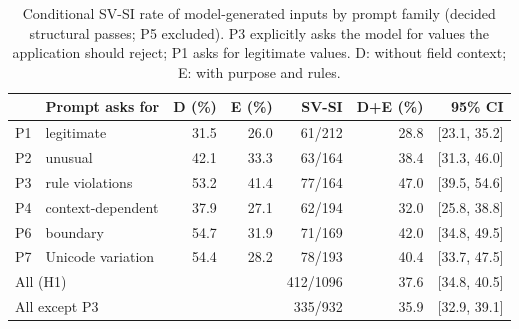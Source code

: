 \begin{table}[t]
\caption{Conditional SV-SI rate of model-generated inputs by prompt family (decided structural passes;
P5 excluded). P3 explicitly asks the model for values the application should reject; P1 asks for
legitimate values. D: without field context; E: with purpose and rules.}
\label{tab:family}
\centering
\footnotesize
\setlength{\tabcolsep}{2pt}
\begin{tabular}{llrrrrr}
\toprule
 & Prompt asks for & D (\%) & E (\%) & SV-SI & D+E (\%) & 95\% CI \\
\midrule
P1 & legitimate & 31.5 & 26.0 & 61/212 & 28.8 & [23.1, 35.2] \\
P2 & unusual & 42.1 & 33.3 & 63/164 & 38.4 & [31.3, 46.0] \\
P3 & rule violations & 53.2 & 41.4 & 77/164 & 47.0 & [39.5, 54.6] \\
P4 & context-dependent & 37.9 & 27.1 & 62/194 & 32.0 & [25.8, 38.8] \\
P6 & boundary & 54.7 & 31.9 & 71/169 & 42.0 & [34.8, 49.5] \\
P7 & Unicode variation & 54.4 & 28.2 & 78/193 & 40.4 & [33.7, 47.5] \\
\midrule
\multicolumn{2}{l}{All (H1)} & & & 412/1096 & 37.6 & [34.8, 40.5] \\
\multicolumn{2}{l}{All except P3} & & & 335/932 & 35.9 & [32.9, 39.1] \\
\bottomrule
\end{tabular}
\end{table}
